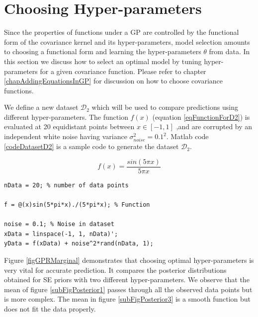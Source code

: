 \section{Choosing Hyper-parameters}\label{secHyperParameter}
Since the properties of functions under a GP are controlled by the functional form of the covariance kernel and its hyper-parameters, model selection amounts to choosing a functional form and learning the hyper-parameters $\theta$ from data. In this section we discuss how to select an optimal model by tuning hyper-parameters for a given covariance function. Please refer to chapter \ref{chapAddingEquationsInGP} for discussion on how to choose covariance functions. 

We define a new dataset $\mathcal{D}_{2}$ which will be used to compare predictions using different hyper-parameters. The function $f(x)$ (equation \ref{eqFunctionForD2}) is evaluated at 20 equidistant points between $x \in [-1, 1]$ ,and are corrupted by an independent white noise having variance $\sigma_{noise}^2 = 0.1^2$. Matlab code \ref{codeDatasetD2} is a sample code to generate the dataset  $\mathcal{D}_{2}$. 

\begin{equation}\label{eqFunctionForD2}
f(x) = \frac{sin(5 \pi x)}{5 \pi x}
\end{equation}

\begin{mdframed}[hidealllines=true,backgroundcolor=lightgray!20]
\begin{lstlisting}[caption={Code for dataset D2}, 
                    captionpos=b, 
                    label={codeDatasetD2},
                    style=Matlab-editor,
                    basicstyle=\color{black}\ttfamily\small,
                    backgroundcolor = \color{MatlabCellColour}]
nData = 20; % number of data points

f = @(x)sin(5*pi*x)./(5*pi*x); % Function

noise = 0.1; % Noise in dataset
xData = linspace(-1, 1, nData)';
yData = f(xData) + noise^2*rand(nData, 1);

\end{lstlisting}
\end{mdframed}

Figure \ref{figGPRMarginal} demonstrates that choosing optimal hyper-parameters is very vital for accurate prediction. It compares the posterior distributions obtained for SE priors with two different hyper-parameters. We observe that the mean of figure \ref{subFigPosterior1} passes through all the observed data points but is more complex. The mean in figure \ref{subFigPosterior3} is a smooth function but does not fit the data properly. 

